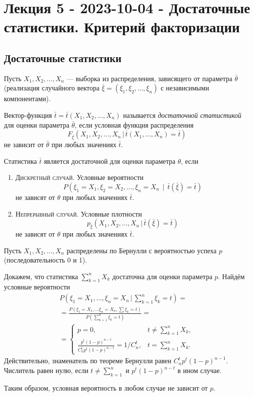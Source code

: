 \chapter{Лекция 5 - 2023-10-04 - Достаточные статистики. Критерий факторизации}
\section{Достаточные статистики}
Пусть $ X_1, X_2, \ldots, X_n $ --- выборка из распределения, зависящего от
параметра $ \bar \theta $ (реализация случайного вектора $ \bar \xi = (\xi_1,
\xi_2, \ldots, \xi_n) $ с независимыми компонентами).

\begin{definition}
  Вектор-функция $\bar t = \bar t(X_1, X_2, \dots, X_n)$ называется \emph{достаточной
	статистикой} для оценки параметра $\bar{\theta}$, если условная функция
	распределения
	\[
		F_{\bar \xi} (X_1, X_2, \dots, X_n\, | \,\bar{t} (X_1, \dots, X_n)
		= \bar t)
	\]
	не зависит от $\bar\theta$ при любых значениях $\bar t$. 
\end{definition}

\begin{remark*}
Статистика $ \bar t $ является достаточной для оценки параметра $ \theta $, если
\begin{enumerate}
	\item \textsc{Дискретный случай}. Условные вероятности 
	\[
			P(\xi_1 = X_1, \xi_2 = X_2, \ldots, \xi_n = X_n\, \mid \, \bar t(\bar \xi) = \bar
			t)
	\]
	не зависят от $ \theta $ при любых значениях $ \bar t $.
\item \textsc{Непрерывный случай}. Условные плотности  
\[
	p_{\bar \xi} (X_1, X_2, \ldots, X_n\, |\,\bar t(\bar \xi) = \bar t)
\]
не зависят от $ \theta $ при любых значениях $ \bar t $.
\end{enumerate}

\end{remark*}

\begin{ex}
  Пусть $X_1, X_2, \dots, X_n$ распределены по Бернулли с вероятностью успеха $p$
	(последовательность 0 и 1).

	Докажем, что статистика $\sum_{k=1}^n X_k$ достаточна для оценки параметра $p$.
Найдём условные вероятности
  \begin{multline*}
		P\left(\xi_1 = X_1, \dots, \xi_n = X_n\,\Big|\, \sum_{k=1}^n \xi_k =
		t\right) = \\
		= \frac{P(\xi_1 = X_1, \dots \xi_n = X_n, \sum \xi_k = t)}{P\left(\sum_{k=1}^n \xi_k = t\right)} = \\
    = \begin{cases}
			p = 0, &t \neq \sum_{k=1}^n X_k, \\
      \frac{ p^t (1-p)^{n-t} }{ C_n^t p^t (1-p)^{n-t} } = 1/C_n^t, &t
			= \sum_{k=1}^n X_k.
    \end{cases}
  \end{multline*}
	Действительно, знаменатель по теореме Бернулли равен $ C^t_n p^t(1-p)^{n-1} $.
	Числитель равен нулю, если $ t \ne \sum_{k=1}^n $ и $ p^t(1-p)^{n-t} $ в ином
	случае.

	Таким образом, условная вероятность в любом случае не зависит от $ p $.
\end{ex}

